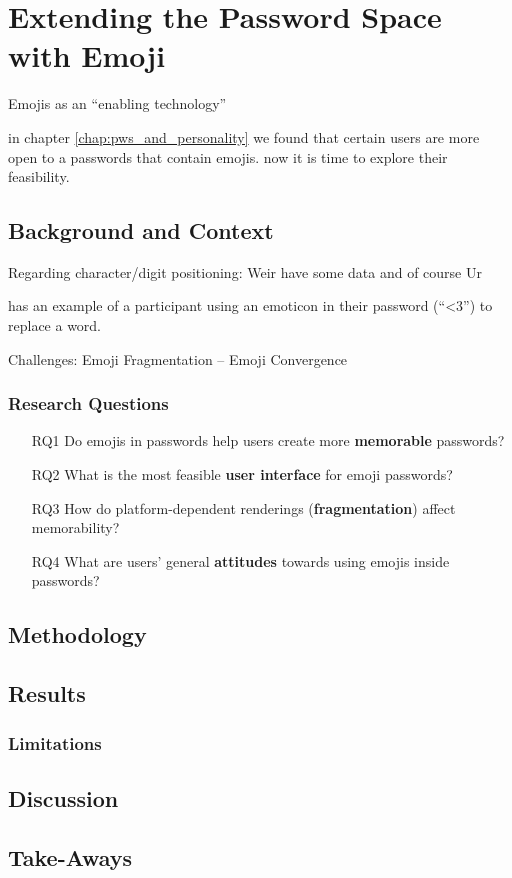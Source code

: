 \chapter[Extending the Password Space with Emoji]{Extending the Password Space with Emoji}\label{chap:emojipasswords}


Emojis as an ``enabling technology''

in chapter \ref{chap:pws_and_personality} we found that certain users are more open to a passwords that contain emojis. now it is time to explore their feasibility. 

\section{Background and Context}

Regarding character/digit positioning: Weir \etal have some data \cite{Weir2010MetricsPolicies} and of course Ur \etal \cite{Ur2015PWCreationLab}



\cite{Kuo2006HumanSelectionMnemonic} has an example of a participant using an emoticon in their password (``<3'') to replace a word. 

Challenges:
Emoji Fragmentation -- Emoji Convergence 

\subsection{Research Questions}

\begin{itemize}
	\item[RQ1] Do emojis in passwords help users create more \textbf{memorable} passwords?
	\item[RQ2] What is the most feasible \textbf{user interface} for emoji passwords?
	\item[RQ3] How do platform-dependent renderings (\textbf{fragmentation}) affect memorability?
	\item[RQ4] What are users' general \textbf{attitudes} towards using emojis inside passwords?
\end{itemize}

\section{Methodology}


\section{Results}


\subsection{Limitations}


\section{Discussion}


\section{Take-Aways}
